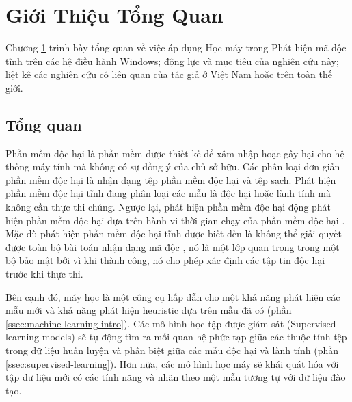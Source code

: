 
\chapter{Giới Thiệu Tổng Quan}
\label{chap:introduction}
\graphicspath{{Chapter2/Figs/}}

\begin{chapabstract}
Chương \ref{chap:introduction} trình bày tổng quan về việc áp dụng Học máy trong Phát hiện mã độc tĩnh trên các hệ điều hành Windows; động lực và mục tiêu của nghiên cứu này; liệt kê các nghiên cứu có liên quan của tác giả ở Việt Nam hoặc trên toàn thế giới.
\end{chapabstract}

\section{Tổng quan}
\label{sec:overview}

Phần mềm độc hại là phần mềm được thiết kế để xâm nhập hoặc gây hại cho hệ thống máy tính mà không có sự đồng ý của chủ sở hữu.
Các phân loại đơn giản phần mềm độc hại là nhận dạng tệp phần mềm độc hại và tệp sạch.
Phát hiện phần mềm độc hại tĩnh đang phân loại các mẫu là độc hại hoặc lành tính mà không cần thực thi chúng.
Ngược lại, phát hiện phần mềm độc hại động phát hiện phần mềm độc hại dựa trên hành vi thời gian chạy của phần mềm độc hại \cite{athiwaratkun2017malware, dahl2013large}. 
Mặc dù phát hiện phần mềm độc hại tĩnh được biết đến là không thể giải quyết được toàn bộ bài toán nhận dạng mã độc \cite{cohen1987computer}, nó là một lớp quan trọng trong một bộ bảo mật bởi vì khi thành công, nó cho phép xác định các tập tin độc hại trước khi thực thi.

Bên cạnh đó, máy học là một công cụ hấp dẫn cho một khả năng phát hiện các mẫu mới và khả năng phát hiện heuristic dựa trên mẫu đã có (phần \ref{ssec:machine-learning-intro}).
Các mô hình học tập được giám sát (Supervised learning models) sẽ tự động tìm ra mối quan hệ phức tạp giữa các thuộc tính tệp trong dữ liệu huấn luyện và phân biệt giữa các mẫu độc hại và lành tính (phần \ref{ssec:supervised-learning}).
Hơn nữa, các mô hình học máy sẽ khái quát hóa với tập dữ liệu mới có các tính năng và nhãn theo một mẫu tương tự với dữ liệu đào tạo.


